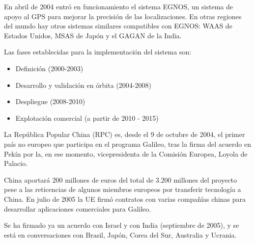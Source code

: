 \documentclass[a4paper,12pt,twoside]{article}
\begin{document}
\begin{description}
En abril de 2004 entr\'o en funcionamiento el sistema EGNOS, un sistema de apoyo al GPS para mejorar la precisi\'on de las localizaciones. En otras regiones del mundo hay otros sistemas similares compatibles con EGNOS: WAAS de Estados Unidos, MSAS de Jap\'on y el GAGAN de la India.

Las fases establecidas para la implementaci\'on del sistema son:

\begin{itemize}
\item Definici\'on (2000-2003)
    \item Desarrollo y validaci\'on en \'orbita (2004-2008)
    \item Despliegue (2008-2010)
    \item Explotaci\'on comercial (a partir de 2010 - 2015)
\end{itemize}

La Rep\'ublica Popular China (RPC) es, desde el 9 de octubre de 2004, el primer pa\'is no europeo que participa en el programa Galileo, tras la firma del acuerdo en Pek\'in por la, en ese momento, vicepresidenta de la Comisi\'on Europea, Loyola de Palacio.

China aportar\'a 200 millones de euros del total de 3.200 millones del proyecto pese a las reticencias de algunos miembros europeos por transferir tecnolog\'ia a China. En julio de 2005 la UE firm\'o contratos con varias compa\~n\'ias chinas para desarrollar aplicaciones comerciales para Galileo.

Se ha firmado ya un acuerdo con Israel y con India (septiembre de 2005), y se est\'a en conversaciones con Brasil, Jap\'on, Corea del Sur, Australia y Ucrania.

\end{description}
     
\end{document}

